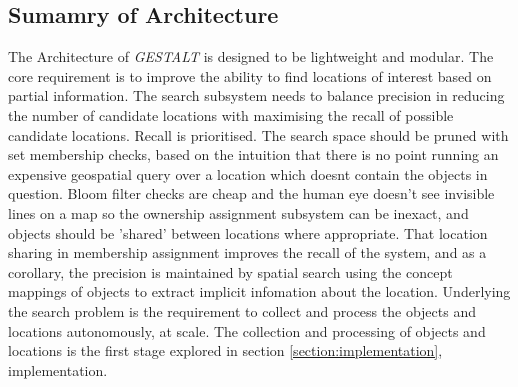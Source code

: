 \subsection{Sumamry of Architecture}
The Architecture of \textit{GESTALT} is designed to be lightweight and modular. The core requirement is to improve the ability to find locations of interest based on partial information. 
The search subsystem needs to balance precision in reducing the number of candidate locations with maximising the recall of possible candidate locations. Recall is prioritised. 
The search space should be pruned with set membership checks, based on the intuition that there is no point running an expensive geospatial query over a location which doesnt contain the objects in question. 
Bloom filter checks are cheap and the human eye doesn't see invisible lines on a map so the ownership assignment subsystem can be inexact, and objects should be 'shared' between locations where appropriate. 
That location sharing in membership assignment improves the recall of the system, and as a corollary, the precision is maintained by spatial search using the concept mappings of objects to extract implicit infomation about the location. 
Underlying the search problem is the requirement to collect and process the objects and locations autonomously, at scale. The collection and processing of objects and locations is the first stage explored in section \ref{section:implementation}, implementation. 